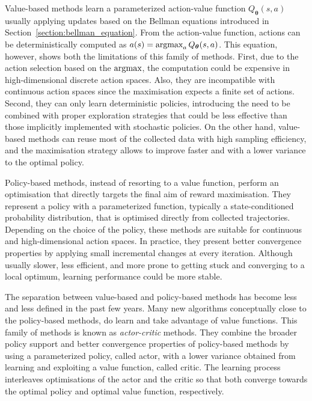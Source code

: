 Value-based methods learn a parameterized action-value function $Q_{\boldsymbol{\theta}}(s, a)$ usually applying updates based on the Bellman equations introduced in Section~\ref{section:bellman_equation}.
From the action-value function, actions can be deterministically computed as $a(s) = \operatorname*{argmax}_a Q_{\boldsymbol{\theta}}(s, a)$.
This equation, however, shows both the limitations of this family of methods.
First, due to the action selection based on the $\operatorname*{argmax}$, the computation could be expensive in high-dimensional discrete action spaces.
Also, they are incompatible with continuous action spaces since the maximisation expects a finite set of actions.
Second, they can only learn deterministic policies, introducing the need to be combined with proper exploration strategies that could be less effective than those implicitly implemented with stochastic policies.
On the other hand, value-based methods can reuse most of the collected data with high sampling efficiency, and the maximisation strategy allows to improve faster and with a lower variance to the optimal policy.

Policy-based methods, instead of resorting to a value function, perform an optimisation that directly targets the final aim of reward maximisation.
They represent a policy with a parameterized function, typically a state-conditioned probability distribution, that is optimised directly from collected trajectories.
Depending on the choice of the policy, these methods are suitable for continuous and high-dimensional action spaces.
In practice, they present better convergence properties by applying small incremental changes at every iteration.
Although usually slower, less efficient, and more prone to getting stuck and converging to a local optimum, learning performance could be more stable.

The separation between value-based and policy-based methods has become less and less defined in the past few years.
Many new algorithms conceptually close to the policy-based methods, do learn and take advantage of value functions.
This family of methods is known as \emph{actor-critic} methods.
They combine the broader policy support and better convergence properties of policy-based methods by using a parameterized policy, called actor, with a lower variance obtained from learning and exploiting a value function, called critic.
The learning process interleaves optimisations of the actor and the critic so that both converge towards the optimal policy and optimal value function, respectively.

